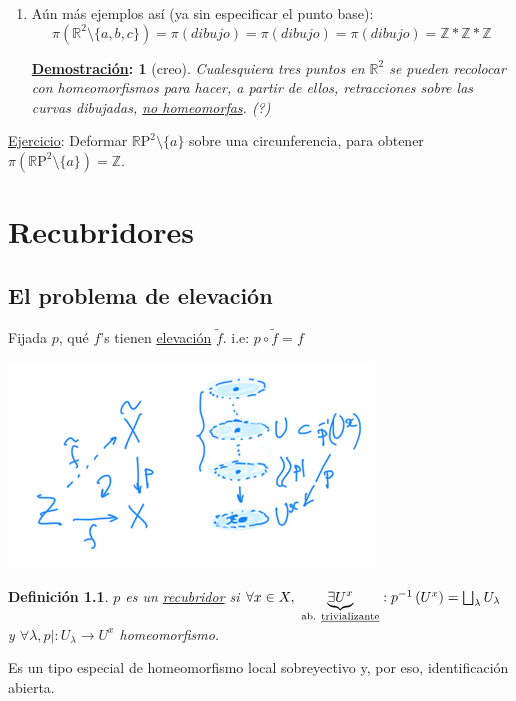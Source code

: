 \documentclass[10pt,a4paper,openright]{book}
\theoremstyle{break}
\newtheorem*{defi}{Definición}
\newtheorem*{demo}{\underline{Demostración}:}
\begin{document}
\begin{enumerate}
    \item Aún más ejemplos así (ya sin especificar el punto base):
    \[
    \pi\left( \mathbb{R}^2 \setminus \{a, b, c\} \right) = \pi\left( dibujo \right) = \pi\left( dibujo \right) = \pi \left( dibujo \right) = \mathbb{Z} * \mathbb{Z} * \mathbb{Z}
    \]
    \begin{demo}[creo]
    Cualesquiera tres puntos en $\mathbb{R}^2$ se pueden recolocar con homeomorfismos para hacer, a partir de ellos, retracciones sobre las curvas dibujadas, \underline{no homeomorfas}. (?) 
    \end{demo}
\end{enumerate}

\underline{Ejercicio}: Deformar $\mathbb{R}\mathrm{P}^2 \setminus \{a\}$ sobre una circunferencia, para obtener $\pi\left( \mathbb{R}\mathrm{P}^2 \setminus \{a\} \right) = \mathbb{Z}$.

\chapter{Recubridores}%
\label{cha:recubridores}
\section{El problema de elevación}%
\label{sec:el_problema_de_elevacion}
Fijada $p$, qué $f$'s tienen \underline{elevación} $\tilde{f}$. i.e: $p \circ \tilde{f} = f$ 
\begin{center}
    \includegraphics[scale=0.3]{images/problema_elevacion} 
\end{center}
\begin{defi}
$p$ es un \underline{recubridor} si $\forall x \in X,\ \underbrace{\exists U^x}_{\text{ab. \underline{trivializante}}} : p^{-1}\left( U^x \right) = \bigsqcup_{\lambda} U_{\lambda}$ y $\forall \lambda, p|: U_{\lambda} \rightarrow U^x$ homeomorfismo.
\end{defi}
Es un tipo especial de homeomorfismo local sobreyectivo y, por eso, identificación abierta.
\end{document}
